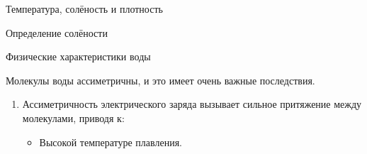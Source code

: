\begin{chapter}{Температура, солёность и плотность}
\begin{section}{Определение солёности}
%
%

Физические характеристики воды 

Молекулы воды ассиметричны, и это имеет очень важные последствия.
\begin{enumerate}
\item
Ассиметричность электрического заряда вызывает сильное притяжение
между молекулами, приводя к:
  \begin{itemize}
  \item Высокой температуре плавления.


\end{itemize}
\end{enumerate}
\end{section}
\end{chapter}
